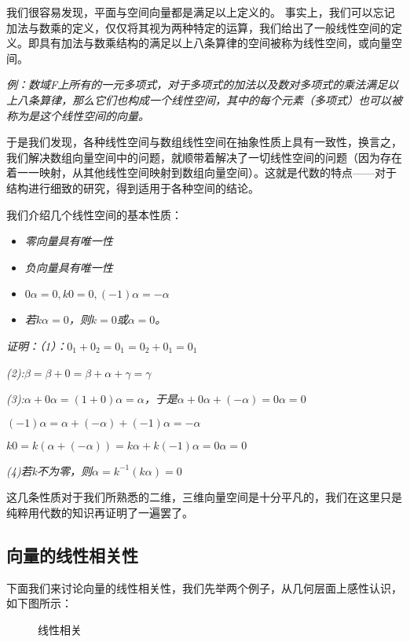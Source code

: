 \documentclass[a4paper]{ctexart}
\begin{document}
我们很容易发现，平面与空间向量都是满足以上定义的。
事实上，我们可以忘记加法与数乘的定义，仅仅将其视为两种特定的运算，我们给出了一般线性空间的定义。即具有加法与数乘结构的满足以上八条算律的空间被称为线性空间，或向量空间。

\textit{例：数域F上所有的一元多项式，对于多项式的加法以及数对多项式的乘法满足以上八条算律，那么它们也构成一个线性空间，其中的每个元素（多项式）也可以被称为是这个线性空间的向量。}

于是我们发现，各种线性空间与数组线性空间在抽象性质上具有一致性，换言之，我们解决数组向量空间中的问题，就顺带着解决了一切线性空间的问题（因为存在着一一映射，从其他线性空间映射到数组向量空间）。这就是代数的特点——对于结构进行细致的研究，得到适用于各种空间的结论。

我们介绍几个线性空间的基本性质：

\begin{itemize}
\item \textit{零向量具有唯一性}
\item \textit{负向量具有唯一性}
\item \textit{$0\alpha=0,k 0=0, (-1)\alpha=-\alpha$}
\item \textit{若$k\alpha=0$，则$k=0$或$\alpha=0$。}
\end{itemize}

\textit{证明：（1）：$0_1+0_2=0_1=0_2+0_1=0_1$}

\textit{(2):$\beta =\beta+0=\beta +\alpha +\gamma=\gamma$}

\textit{(3):$\alpha+0\alpha=(1+0)\alpha=\alpha$，于是$\alpha+0\alpha+(-\alpha)=0\alpha=0$}

\textit{$(-1)\alpha=\alpha+(-\alpha)+(-1)\alpha=-\alpha$}

\textit{$k0=k(\alpha+(-\alpha))=k\alpha+k(-1)\alpha=0\alpha=0$}

\textit{(4)若k不为零，则$\alpha=k^{-1}(k\alpha)=0$}

这几条性质对于我们所熟悉的二维，三维向量空间是十分平凡的，我们在这里只是纯粹用代数的知识再证明了一遍罢了。

\subsection{向量的线性相关性}
下面我们来讨论向量的线性相关性，我们先举两个例子，从几何层面上感性认识，如下图所示：

\begin{figure}[htp]
\centering
{}
\caption{线性相关}
\end{figure}
\end{document}

